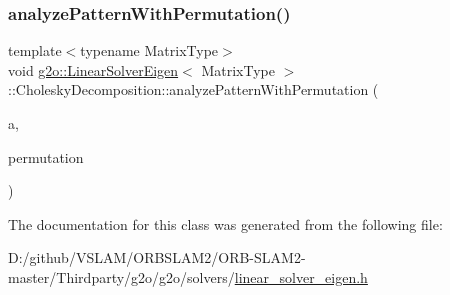 \subsubsection{\texorpdfstring{analyze\+Pattern\+With\+Permutation()}{analyzePatternWithPermutation()}}
{\footnotesize\ttfamily template$<$typename Matrix\+Type$>$ \\
void \mbox{\hyperlink{classg2o_1_1_linear_solver_eigen}{g2o\+::\+Linear\+Solver\+Eigen}}$<$ Matrix\+Type $>$\+::Cholesky\+Decomposition\+::analyze\+Pattern\+With\+Permutation (\begin{DoxyParamCaption}\item[{\mbox{\hyperlink{classg2o_1_1_linear_solver_eigen_aeb7e2400bed3a249b5f29ce7cc00cd33}{Sparse\+Matrix}} \&}]{a,  }\item[{const \mbox{\hyperlink{classg2o_1_1_linear_solver_eigen_acd9dd4e15dfbbad2720f1b83519333e8}{Permutation\+Matrix}} \&}]{permutation }\end{DoxyParamCaption})\hspace{0.3cm}{\ttfamily [inline]}}



The documentation for this class was generated from the following file\+:\begin{DoxyCompactItemize}
\item 
D\+:/github/\+V\+S\+L\+A\+M/\+O\+R\+B\+S\+L\+A\+M2/\+O\+R\+B-\/\+S\+L\+A\+M2-\/master/\+Thirdparty/g2o/g2o/solvers/\mbox{\hyperlink{linear__solver__eigen_8h}{linear\+\_\+solver\+\_\+eigen.\+h}}\end{DoxyCompactItemize}
